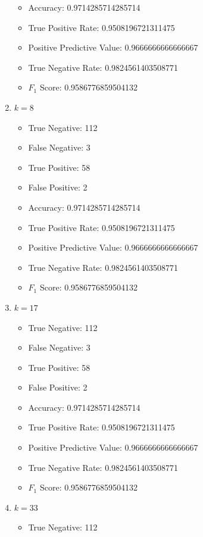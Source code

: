 \documentclass[12pt]{article}
\begin{document}
\begin{enumerate}
\begin{itemize}
        	\item Accuracy: 0.9714285714285714
        	\item True Positive Rate: 0.9508196721311475
        	\item Positive Predictive Value: 0.9666666666666667
        	\item True Negative Rate: 0.9824561403508771
        	\item $F_1$ Score: 0.9586776859504132
        \end{itemize}
        \item $k = 8$
        \begin{itemize}
        	\item True Negative: 112
        	\item False Negative: 3
        	\item True Positive: 58
        	\item False Positive: 2
        	\item Accuracy: 0.9714285714285714
        	\item True Positive Rate: 0.9508196721311475
        	\item Positive Predictive Value: 0.9666666666666667
        	\item True Negative Rate: 0.9824561403508771
        	\item $F_1$ Score: 0.9586776859504132
        \end{itemize}
        \item $k = 17$
        \begin{itemize}
        	\item True Negative: 112
        	\item False Negative: 3
        	\item True Positive: 58
        	\item False Positive: 2
        	\item Accuracy: 0.9714285714285714
        	\item True Positive Rate: 0.9508196721311475
        	\item Positive Predictive Value: 0.9666666666666667
        	\item True Negative Rate: 0.9824561403508771
        	\item $F_1$ Score: 0.9586776859504132
        \end{itemize}
        \item $k = 33$
        \begin{itemize}
        	\item True Negative: 112

\end{itemize}
\end{enumerate}
\end{document}
